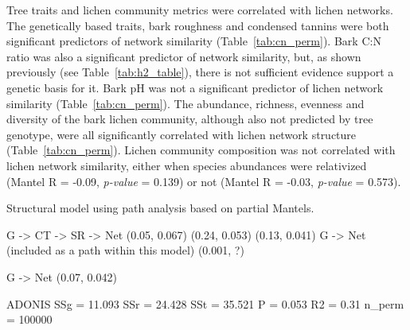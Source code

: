 \documentclass[11pt,twocolumn,twoside,lineno]{pnas-new}
\begin{document}
Tree traits and lichen community metrics were correlated with lichen
networks. The genetically based traits, bark roughness and condensed
tannins were both significant predictors of network similarity
(Table~\ref{tab:cn_perm}). Bark C:N ratio was also a significant
predictor of network similarity, but, as shown previously (see
Table~\ref{tab:h2_table}), there is not sufficient evidence support a
genetic basis for it. Bark pH was not a significant predictor of
lichen network similarity (Table~\ref{tab:cn_perm}). The abundance,
richness, evenness and diversity of the bark lichen community,
although also not predicted by tree genotype, were all significantly
correlated with lichen network structure
(Table~\ref{tab:cn_perm}). Lichen community composition was not
correlated with lichen network similarity, either when species
abundances were relativized (Mantel R = -0.09, \textit{p-value} =
0.139) or not (Mantel R = -0.03, \textit{p-value} = 0.573). 



Structural model using path analysis based on partial Mantels.

G -> CT         -> SR         -> Net
(0.05, 0.067) (0.24, 0.053) (0.13, 0.041)
G -> Net (included as a path within this model) 
(0.001, ?)

G -> Net
(0.07, 0.042)

ADONIS
SSg = 11.093
SSr = 24.428
SSt = 35.521
P = 0.053
R2 = 0.31
n_perm = 100000

\end{document}
